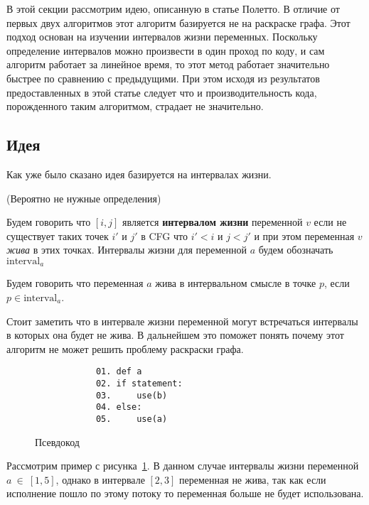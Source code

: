 В этой секции рассмотрим идею, описанную в статье Полетто. В отличие от первых двух алгоритмов
этот алгоритм базируется не на раскраске графа. Этот подход основан на изучении интервалов жизни
переменных. Поскольку определение интервалов можно произвести в один проход по коду, и сам алгоритм
работает за линейное время, то этот метод работает значительно быстрее по сравнению с предыдущими.
При этом исходя из результатов предоставленных в этой статье следует что и производительность
кода, порожденного таким алгоритмом, страдает не значительно.

\subsection{Идея}

Как уже было сказано идея базируется на интервалах жизни.

(Вероятно не нужные определения)

\begin{definition}
    Будем говорить что $[i, j]$ является \textbf{интервалом жизни} переменной $v$ если не существует таких
    точек $i'$ и $j'$ в CFG что $i' < i$ и $j < j'$ и при этом переменная $v$ \textit{жива} в этих точках.
    Интервалы жизни для переменной $a$ будем обозначать $\text{interval}_a$
\end{definition}

\begin{definition}
    Будем говорить что переменная $a$ жива в интервальном смысле в точке $p$, если $p \in \text{interval}_a$. 
\end{definition}

Стоит заметить что в интервале жизни переменной могут встречаться интервалы в которых она будет
не жива. В дальнейшем это поможет понять почему этот алгоритм не может решить проблему раскраски графа.

\begin{example}
    \begin{figure}[h]
        \centering
        \lstset{basicstyle=\ttfamily\small, frame=single}
        \begin{lstlisting}
            01. def a
            02. if statement:
            03.     use(b)
            04. else:
            05.     use(a)
        \end{lstlisting}
        \caption{Псевдокод}
        \label{fig:example_live_intervals}
    \end{figure}

    Рассмотрим пример с рисунка~\ref{fig:example_live_intervals}. В данном случае интервалы жизни переменной
    $a~\in~[1,5]$, однако в интервале $[2,3]$ переменная не жива, так как если исполнение пошло по этому потоку
    то переменная больше не будет использована.
    
\end{example}

